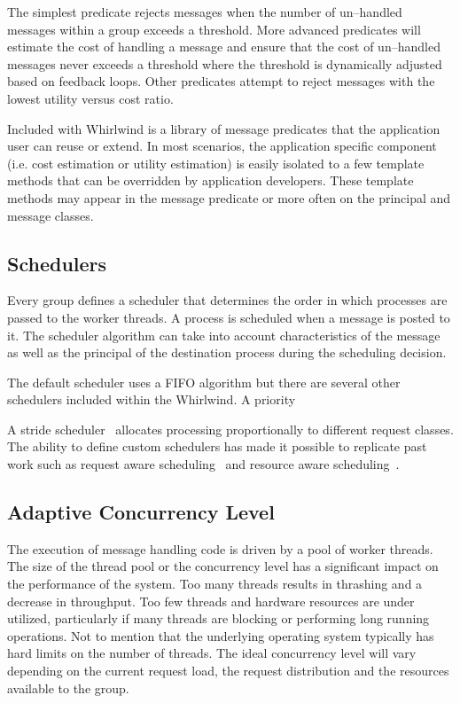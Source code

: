 \documentclass[conference]{IEEEtran}
\begin{document}
The simplest predicate rejects messages when the number of un--handled messages within a group exceeds a threshold. More advanced predicates will estimate the cost of handling a message and ensure that the cost of un--handled messages never exceeds a threshold where the threshold is dynamically adjusted based on feedback loops. Other predicates attempt to reject messages with the lowest utility versus cost ratio.

Included with Whirlwind is a library of message predicates that the application user can reuse or extend. In most scenarios, the application specific component (i.e. cost estimation or utility estimation) is easily isolated to a few template methods that can be overridden by application developers. These template methods may appear in the message predicate or more often on the principal and message classes.

\subsection{Schedulers}

Every group defines a scheduler that determines the order in which processes are passed to the worker threads. A process is scheduled when a message is posted to it. The scheduler algorithm can take into account characteristics of the message as well as the principal of the destination process during the scheduling decision.

The default scheduler uses a FIFO algorithm but there are several other schedulers included within the Whirlwind. A priority 

A stride scheduler~\cite{Stride:Waldspurger:95} allocates processing proportionally to different request classes. The ability to define custom schedulers has made it possible to replicate past work such as request aware scheduling~\cite{Zhou06RequestAware} and resource aware scheduling~\cite{Behren03Capriccio}.

\subsection{Adaptive Concurrency Level}

The execution of message handling code is driven by a pool of worker threads. The size of the thread pool or the concurrency level has a significant impact on the performance of the system. Too many threads results in thrashing and a decrease in throughput. Too few threads and hardware resources are under utilized, particularly if many threads are blocking or performing long running operations. Not to mention that the underlying operating system typically has hard limits on the number of threads. The ideal concurrency level will vary depending on the current request load, the request distribution and the resources available to the group.
\end{document}
